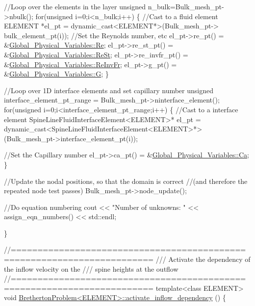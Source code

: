 \begin{DoxyCodeInclude}
 \textcolor{comment}{//Loop over the elements in the layer}
 \textcolor{keywordtype}{unsigned} n\_bulk=Bulk\_mesh\_pt->nbulk();
 \textcolor{keywordflow}{for}(\textcolor{keywordtype}{unsigned} i=0;i<n\_bulk;i++)
  \{
   \textcolor{comment}{//Cast to a fluid element}
   ELEMENT *el\_pt = \textcolor{keyword}{dynamic\_cast<}ELEMENT*\textcolor{keyword}{>}(Bulk\_mesh\_pt->
                                           bulk\_element\_pt(i));
   \textcolor{comment}{//Set the Reynolds number, etc}
   el\_pt->re\_pt() = &\hyperlink{namespaceGlobal__Physical__Variables_ab814e627d2eb5bc50318879d19ab16b9}{Global\_Physical\_Variables::Re};
   el\_pt->re\_st\_pt() = &\hyperlink{namespaceGlobal__Physical__Variables_a085ee4bf968ffdd01a41b8c41864f907}{Global\_Physical\_Variables::ReSt};
   el\_pt->re\_invfr\_pt() = &\hyperlink{namespaceGlobal__Physical__Variables_aa6286f02b476912dd7550eced538331a}{Global\_Physical\_Variables::ReInvFr};
   el\_pt->g\_pt() = &\hyperlink{namespaceGlobal__Physical__Variables_a18fe245262ec8beec764c805bb93e73c}{Global\_Physical\_Variables::G};
  \}

 \textcolor{comment}{//Loop over 1D interface elements and set capillary number}
 \textcolor{keywordtype}{unsigned} interface\_element\_pt\_range = Bulk\_mesh\_pt->ninterface\_element();
 \textcolor{keywordflow}{for}(\textcolor{keywordtype}{unsigned} i=0;i<interface\_element\_pt\_range;i++)
  \{
   \textcolor{comment}{//Cast to a interface element}
   SpineLineFluidInterfaceElement<ELEMENT>* el\_pt = 
    \textcolor{keyword}{dynamic\_cast<}SpineLineFluidInterfaceElement<ELEMENT>*\textcolor{keyword}{>}
    (Bulk\_mesh\_pt->interface\_element\_pt(i));

   \textcolor{comment}{//Set the Capillary number}
   el\_pt->ca\_pt() = &\hyperlink{namespaceGlobal__Physical__Variables_a8b32b93d2e546f9375ec418474107838}{Global\_Physical\_Variables::Ca};
  \}

 \textcolor{comment}{//Update the nodal positions, so that the domain is correct}
 \textcolor{comment}{//(and therefore the repeated node test passes)}
 Bulk\_mesh\_pt->node\_update();

 \textcolor{comment}{//Do equation numbering}
 cout << \textcolor{stringliteral}{"Number of unknowns: "} << assign\_eqn\_numbers() << std::endl; 

\}



\textcolor{comment}{//========================================================================}\textcolor{comment}{}
\textcolor{comment}{/// Activate the dependency of the inflow velocity on the }
\textcolor{comment}{/// spine heights at the outflow}
\textcolor{comment}{}\textcolor{comment}{//========================================================================}
\textcolor{keyword}{template}<\textcolor{keyword}{class} ELEMENT>
\textcolor{keywordtype}{void} \hyperlink{classBrethertonProblem_a04257edfb80f2ff3bf865442d9eb01fb}{BrethertonProblem<ELEMENT>::activate\_inflow\_dependency}
      ()
\{


\end{DoxyCodeInclude}
